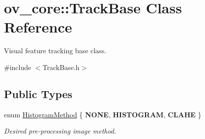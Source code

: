 \hypertarget{classov__core_1_1TrackBase}{}\section{ov\+\_\+core\+:\+:Track\+Base Class Reference}
\label{classov__core_1_1TrackBase}


Visual feature tracking base class.  




{\ttfamily \#include $<$Track\+Base.\+h$>$}

\subsection*{Public Types}
\begin{DoxyCompactItemize}
\item 
\mbox{\label{classov__core_1_1TrackBase_aa4b34a5dce99b59522d57bf9278c9a1a}} 
enum \hyperlink{classov__core_1_1TrackBase_aa4b34a5dce99b59522d57bf9278c9a1a}{Histogram\+Method} \{ {\bfseries N\+O\+NE}, 
{\bfseries H\+I\+S\+T\+O\+G\+R\+AM}, 
{\bfseries C\+L\+A\+HE}
 \}\begin{DoxyCompactList}\small\item\em Desired pre-\/processing image method. \end{DoxyCompactList}
\end{DoxyCompactItemize}
